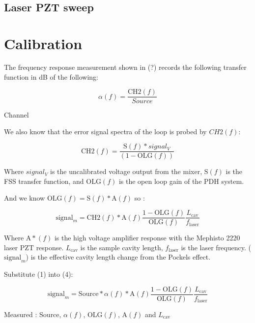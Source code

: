 \subsection{Laser PZT sweep}



\section{Calibration}\label{sec:calibration_math}
The frequency response measurement shown in (?) records the following transfer function in dB of the following:

\begin{equation}
\alpha(f) = \frac{\mathrm{CH2}(f)}{Source}
\end{equation}

Channel

We also know that the error signal spectra of the loop is probed by $CH2(f)$:


\begin{equation}
\mathrm{CH2}(f) = \frac{\mathrm{S}(f)*signal_V}{(1-\mathrm{OLG}(f))}
\end{equation}

Where $signal_V$ is the uncalibrated voltage output from the mixer, $\mathrm{S}(f)$ is the FSS transfer function, and $\mathrm{OLG}(f)$ is the open loop gain of the PDH system.

And we know $\mathrm{OLG}(f) = \mathrm{S}(f)*\mathrm{A}(f)$ so :

\begin{equation}
\mathrm{signal}_m = \mathrm{CH2}(f)*\mathrm{A}(f) \frac{1-\mathrm{OLG}(f)}{\mathrm{OLG}(f)} \frac{L_\mathrm{cav}}{f_\mathrm{laser}}
\end{equation}

Where $\mathrm{A}*(f)$ is the high voltage amplifier response with the Mephisto 2220 laser PZT response. $L_\mathrm{cav}$ is the sample cavity length, $f_\mathrm{laser}$ is the laser frequency. ($\mathrm{signal}_m$)  is the effective cavity length change from the Pockels effect.

Substitute (1) into (4):

\begin{equation}
\mathrm{signal}_m = \mathrm{Source} * \alpha(f) * \mathrm{A}(f) \frac{1-\mathrm{OLG}(f)}{\mathrm{OLG}(f)} \frac{L_\mathrm{cav}}{f_\mathrm{laser}}
\end{equation}

Measured :
Source, $\alpha (f)$, OLG$(f)$, A$(f)$ and $L_\mathrm{cav}$

